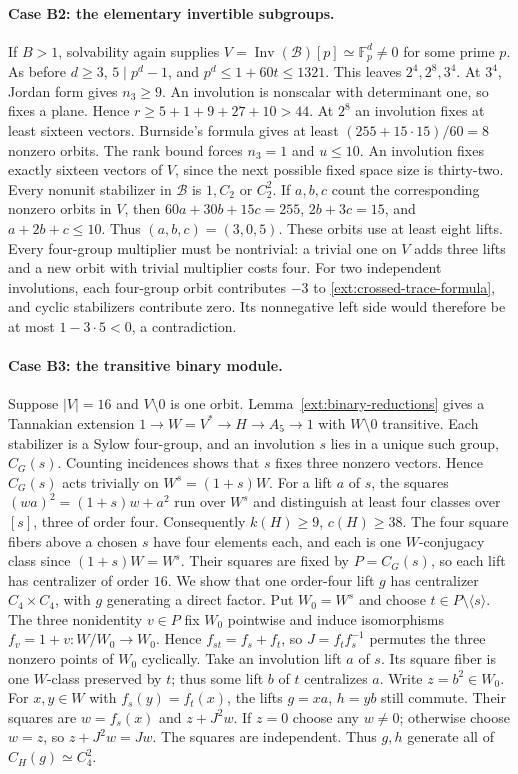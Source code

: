 \documentclass[11pt]{amsart}
\numberwithin{equation}{section}
\theoremstyle{definition}
\theoremstyle{plain}
\begin{document}
\paragraph{Case B2: the elementary invertible subgroups.}\label{ext:neutral-B2}
If $B>1$, solvability again supplies $V=\operatorname{Inv}(\mathcal B)[p]
\simeq\mathbb F_p^d\ne0$ for some prime $p$. As before $d\ge3$,
$5\mid p^d-1$, and $p^d\le1+60t\le1321$. This leaves
$2^4,2^8,3^4$. At $3^4$, Jordan form gives $n_3\ge9$. An involution
is nonscalar with determinant one, so fixes a plane. Hence
$r\ge5+1+9+27+10>44$.
At $2^8$ an involution fixes at least sixteen vectors. Burnside's
formula gives at least $(255+15\cdot15)/60=8$ nonzero orbits.
The rank bound forces $n_3=1$ and $u\le10$. An involution
fixes exactly sixteen vectors of $V$, since the next possible fixed
space size is thirty-two. Every nonunit stabilizer in $\mathcal B$
is $1,C_2$ or $C_2^2$.
If $a,b,c$ count the corresponding nonzero orbits in $V$, then
$60a+30b+15c=255$, $2b+3c=15$, and $a+2b+c\le10$.
Thus $(a,b,c)=(3,0,5)$. These orbits use at least eight lifts.
Every four-group multiplier must be nontrivial: a trivial one on
$V$ adds three lifts and a new orbit with trivial multiplier costs
four. For two independent involutions, each four-group orbit contributes
$-3$ to \eqref{ext:crossed-trace-formula}, and cyclic stabilizers
contribute zero. Its nonnegative left side would therefore be at
most $1-3\cdot5<0$, a contradiction.

\paragraph{Case B3: the transitive binary module.}\label{ext:neutral-B3}
Suppose $|V|=16$ and $V\setminus0$ is one orbit.
Lemma~\ref{ext:binary-reductions} gives a Tannakian extension
$1\to W=V^*\to H\to A_5\to1$ with $W\setminus0$ transitive. Each stabilizer is a Sylow
four-group, and an involution $s$ lies in a unique such group,
$C_G(s)$. Counting incidences shows that $s$ fixes three nonzero
vectors. Hence $C_G(s)$ acts trivially on $W^s=(1+s)W$.
For a lift $a$ of $s$, the squares $(wa)^2=(1+s)w+a^2$ run over
$W^s$ and distinguish at least four classes over $[s]$, three of
order four. Consequently $k(H)\ge9$,
$c(H)\ge38$. The four square fibers above a chosen $s$ have four
elements each, and each is one $W$-conjugacy class since $(1+s)W=W^s$.
Their squares are fixed by $P=C_G(s)$, so each lift has centralizer
of order $16$. We show that one order-four lift $g$ has centralizer
$C_4\times C_4$, with $g$ generating a direct factor. Put
$W_0=W^s$ and choose $t\in P\setminus\langle s\rangle$. The
three nonidentity $v\in P$ fix $W_0$ pointwise and induce
isomorphisms $f_v=1+v:W/W_0\to W_0$. Hence
$f_{st}=f_s+f_t$, so $J=f_tf_s^{-1}$ permutes the three nonzero
points of $W_0$ cyclically. Take an involution lift $a$ of $s$.
Its square fiber is one $W$-class preserved by $t$; thus some lift
$b$ of $t$ centralizes $a$. Write $z=b^2\in W_0$. For $x,y\in W$
with $f_s(y)=f_t(x)$, the lifts $g=xa$, $h=yb$ still commute.
Their squares are $w=f_s(x)$ and $z+J^2w$. If $z=0$ choose any
$w\ne0$; otherwise choose $w=z$, so $z+J^2w=Jw$. The squares
are independent. Thus $g,h$ generate all of $C_H(g)\simeq C_4^2$.
\end{document}
